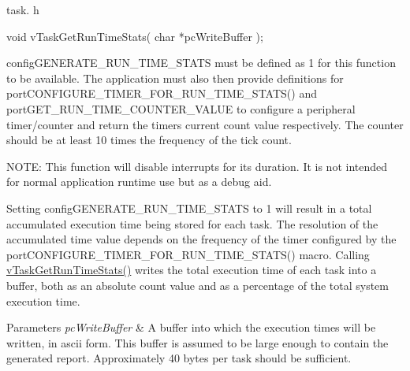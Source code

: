 task. h 
\begin{DoxyPre}void vTaskGetRunTimeStats( char *pcWriteBuffer );\end{DoxyPre}


config\-G\-E\-N\-E\-R\-A\-T\-E\-\_\-\-R\-U\-N\-\_\-\-T\-I\-M\-E\-\_\-\-S\-T\-A\-T\-S must be defined as 1 for this function to be available. The application must also then provide definitions for port\-C\-O\-N\-F\-I\-G\-U\-R\-E\-\_\-\-T\-I\-M\-E\-R\-\_\-\-F\-O\-R\-\_\-\-R\-U\-N\-\_\-\-T\-I\-M\-E\-\_\-\-S\-T\-A\-T\-S() and port\-G\-E\-T\-\_\-\-R\-U\-N\-\_\-\-T\-I\-M\-E\-\_\-\-C\-O\-U\-N\-T\-E\-R\-\_\-\-V\-A\-L\-U\-E to configure a peripheral timer/counter and return the timers current count value respectively. The counter should be at least 10 times the frequency of the tick count.

N\-O\-T\-E\-: This function will disable interrupts for its duration. It is not intended for normal application runtime use but as a debug aid.

Setting config\-G\-E\-N\-E\-R\-A\-T\-E\-\_\-\-R\-U\-N\-\_\-\-T\-I\-M\-E\-\_\-\-S\-T\-A\-T\-S to 1 will result in a total accumulated execution time being stored for each task. The resolution of the accumulated time value depends on the frequency of the timer configured by the port\-C\-O\-N\-F\-I\-G\-U\-R\-E\-\_\-\-T\-I\-M\-E\-R\-\_\-\-F\-O\-R\-\_\-\-R\-U\-N\-\_\-\-T\-I\-M\-E\-\_\-\-S\-T\-A\-T\-S() macro. Calling \hyperlink{_common_2_libraries_2_free_r_t_o_s_2_source_2include_2task_8h_ac34910d5eac69f0538ee218e527663a7}{v\-Task\-Get\-Run\-Time\-Stats()} writes the total execution time of each task into a buffer, both as an absolute count value and as a percentage of the total system execution time.


\begin{DoxyParams}{Parameters}
{\em pc\-Write\-Buffer} & A buffer into which the execution times will be written, in ascii form. This buffer is assumed to be large enough to contain the generated report. Approximately 40 bytes per task should be sufficient. \\
\hline
\end{DoxyParams}
